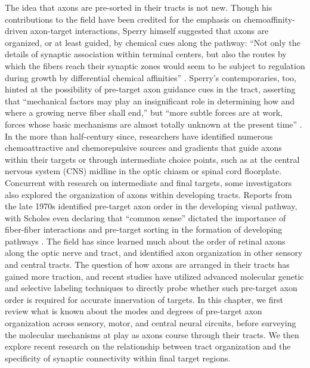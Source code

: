 The idea that axons are pre-sorted in their tracts is not new.
Though his contributions to the field have been credited for the emphasis on chemoaffinity-driven axon-target interactions, Sperry himself suggested that axons are organized, or at least guided, by chemical cues along the pathway: “Not only the details of synaptic association within terminal centers, but also the routes by which the fibers reach their synaptic zones would seem to be subject to regulation during growth by differential chemical affinities” \cite{attardi1963preferential}.
Sperry’s contemporaries, too, hinted at the possibility of pre-target axon guidance cues in the tract, asserting that “mechanical factors may play an insignificant role in determining how and where a growing nerve fiber shall end,” but “more subtle forces are at work, forces whose basic mechanisms are almost totally unknown at the present time” \cite{barnard1956study}.
In the more than half-century since, researchers have identified numerous chemoattractive and chemorepulsive sources and gradients that guide axons within their targets or through intermediate choice points, such as at the central nervous system (CNS) midline in the optic chiasm or spinal cord floorplate. %
Concurrent with research on intermediate and final targets, some investigators also explored the organization of axons within developing tracts.
Reports from the late 1970s identified pre-target axon order in the developing visual pathway, with Scholes even declaring that “common sense” dictated the importance of fiber-fiber interactions and pre-target sorting in the formation of developing pathways \cite{cook1977multiple,scholes1979nerve}.
The field has since learned much about the order of retinal axons along the optic nerve and tract, and identified axon organization in other sensory and central tracts. %
The question of how axons are arranged in their tracts has gained more traction, and recent studies have utilized advanced molecular genetic and selective labeling techniques to directly probe whether such pre-target axon order is required for accurate innervation of targets.
In this chapter, we first review what is known about the modes and degrees of pre-target axon organization across sensory, motor, and central neural circuits, before surveying the molecular mechanisms at play as axons course through their tracts.
We then explore recent research on the relationship between tract organization and the specificity of synaptic connectivity within final target regions.
